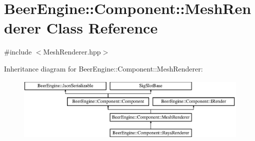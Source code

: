 \hypertarget{class_beer_engine_1_1_component_1_1_mesh_renderer}{}\section{Beer\+Engine\+:\+:Component\+:\+:Mesh\+Renderer Class Reference}
\label{class_beer_engine_1_1_component_1_1_mesh_renderer}


{\ttfamily \#include $<$Mesh\+Renderer.\+hpp$>$}

Inheritance diagram for Beer\+Engine\+:\+:Component\+:\+:Mesh\+Renderer\+:\begin{figure}[H]
\begin{center}
\leavevmode
\includegraphics[height=3.047619cm]{class_beer_engine_1_1_component_1_1_mesh_renderer}
\end{center}
\end{figure}
